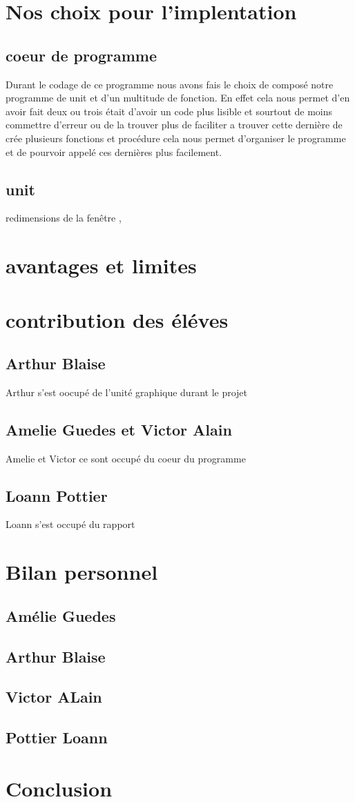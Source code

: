\documentclass[12pt]{report}
\begin{document}
\section{Nos choix pour l'implentation}
	\subsection{coeur de programme}
Durant le codage de ce programme nous avons fais le choix de composé notre programme de unit et d'un multitude de fonction. En effet cela nous permet  d'en avoir fait deux ou trois était d'avoir un code plus lisible et sourtout de moins commettre d'erreur ou de la trouver plus de faciliter a trouver cette dernière 
de crée plusieurs fonctions et procédure cela nous permet d'organiser le programme et de pourvoir appelé ces dernières plus facilement. 
	\subsection{unit}
redimensions de la fenêtre ,
\section{avantages et limites}


\section{contribution des éléves}
\subsection{Arthur Blaise}
	Arthur s'est oocupé de l'unité graphique durant le projet 
\subsection{Amelie Guedes et Victor Alain}
 Amelie et Victor ce sont occupé du coeur du programme 
\subsection{Loann Pottier}
Loann s'est occupé du rapport 
\section{Bilan personnel}
\subsection{Amélie Guedes}
\subsection{Arthur Blaise}
\subsection{Victor ALain}
\subsection{Pottier Loann}
\section{Conclusion}
			
\end{document}
